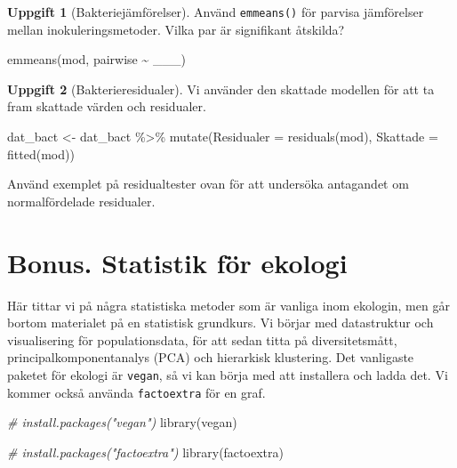 \documentclass[
]{book}
\newenvironment{Shaded}{\begin{snugshade}}{\end{snugshade}}
\newcommand{\AttributeTok}[1]{\textcolor[rgb]{0.77,0.63,0.00}{#1}}
\newcommand{\CommentTok}[1]{\textcolor[rgb]{0.56,0.35,0.01}{\textit{#1}}}
\newcommand{\FunctionTok}[1]{\textcolor[rgb]{0.00,0.00,0.00}{#1}}
\newcommand{\NormalTok}[1]{#1}
\newcommand{\OtherTok}[1]{\textcolor[rgb]{0.56,0.35,0.01}{#1}}
\newcommand{\SpecialCharTok}[1]{\textcolor[rgb]{0.00,0.00,0.00}{#1}}
\theoremstyle{definition}
\theoremstyle{definition}
\theoremstyle{definition}
\newtheorem{exercise}{Uppgift}[chapter]
\theoremstyle{definition}
\theoremstyle{remark}
\begin{document}
\begin{exercise}[Bakteriejämförelser]

Använd \texttt{emmeans()} för parvisa jämförelser mellan inokuleringsmetoder. Vilka par är signifikant åtskilda?

\begin{Shaded}
\begin{Highlighting}[]
\FunctionTok{emmeans}\NormalTok{(mod, pairwise }\SpecialCharTok{\textasciitilde{}}\NormalTok{ \_\_\_)}
\end{Highlighting}
\end{Shaded}

\end{exercise}

\begin{exercise}[Bakterieresidualer]
Vi använder den skattade modellen för att ta fram skattade värden och residualer.

\begin{Shaded}
\begin{Highlighting}[]
\NormalTok{dat\_bact }\OtherTok{\textless{}{-}}\NormalTok{ dat\_bact }\SpecialCharTok{\%\textgreater{}\%} 
  \FunctionTok{mutate}\NormalTok{(}\AttributeTok{Residualer =} \FunctionTok{residuals}\NormalTok{(mod),}
         \AttributeTok{Skattade =} \FunctionTok{fitted}\NormalTok{(mod))}
\end{Highlighting}
\end{Shaded}

Använd exemplet på residualtester ovan för att undersöka antagandet om normalfördelade residualer.
\end{exercise}

\hypertarget{bonus.-statistik-fuxf6r-ekologi}{%
\section{Bonus. Statistik för ekologi}\label{bonus.-statistik-fuxf6r-ekologi}}

Här tittar vi på några statistiska metoder som är vanliga inom ekologin, men går bortom materialet på en statistisk grundkurs. Vi börjar med datastruktur och visualisering för populationsdata, för att sedan titta på diversitetsmått, principalkomponentanalys (PCA) och hierarkisk klustering. Det vanligaste paketet för ekologi är \texttt{vegan}, så vi kan börja med att installera och ladda det. Vi kommer också använda \texttt{factoextra} för en graf.

\begin{Shaded}
\begin{Highlighting}[]
\CommentTok{\# install.packages("vegan")}
\FunctionTok{library}\NormalTok{(vegan)}

\CommentTok{\# install.packages("factoextra")}
\FunctionTok{library}\NormalTok{(factoextra)}
\end{Highlighting}
\end{Shaded}
\end{document}

